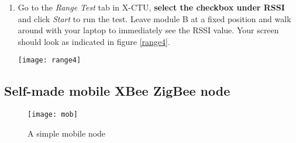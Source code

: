 \begin{enumerate}
\begin{itemize}
\begin{minipage}{\linewidth}
            \label{range3}
        \end{minipage}		
     \end{itemize}
     \vfill
     \pagebreak
     \item Go to the \textit{Range Test} tab in X-CTU, \textbf{select the checkbox under RSSI} and click \textit{Start} to run the test. Leave module B at a fixed position and walk around with your laptop to immediately see the RSSI value. Your screen should look as indicated in figure \ref{range4}. \par
             \begin{minipage}{\linewidth}
            \centering
            \texttt{[image: range4]}
            \label{range4}
        \end{minipage}
\end{enumerate}

\vfill
\pagebreak
\subsection{Self-made mobile XBee ZigBee node}
\label{mob}
\begin{figure}[htbp]
\centering
\texttt{[image: mob]}
\caption{A simple mobile node}
\end{figure} 